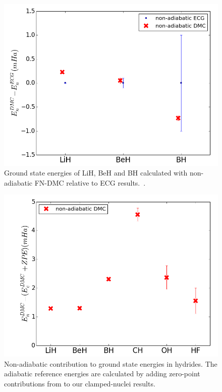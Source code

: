 \documentclass[pra,superscriptaddress,groupedaddress,twocolumn]{revtex4}
\begin{document}
\begin{figure}[h]
\centering
\includegraphics[scale=.4]{Figures/dia-ECG}
\caption{Ground state energies of LiH, BeH and BH calculated with non-adiabatic FN-DMC relative to ECG results.~\cite{Adamowicz_LiH,Koput_BeH,Miliordos_BH}.}
\end{figure}

\begin{figure}[h]
\includegraphics[scale=.4]{Figures/hydride-ZPE}
\caption{Non-adiabatic contribution to ground state energies in hydrides. The adiabatic reference energies are calculated by adding zero-point contributions from \cite{Feller_Corrections} to our clamped-nuclei results.}
\end{figure}
\end{document}
